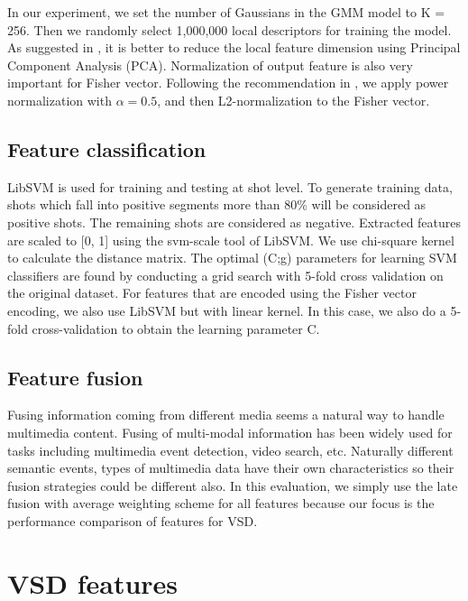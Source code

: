 \documentclass[twocolumn]{bmcart}%
\begin{document}
In our experiment, we set the number of Gaussians in the GMM model to K = 256. Then we randomly select 1,000,000 local descriptors for training the model. As suggested in \cite{perronnin2010improving}, it is better to reduce the local feature dimension using Principal Component Analysis (PCA). Normalization of output feature is also very important for Fisher vector. Following the recommendation in \cite{perronnin2010improving}, we apply power normalization with $\alpha=0.5$, and then L2-normalization to the Fisher vector.

\subsection{Feature classification}

LibSVM \cite{LibSVM} is used for training and testing at shot level. To generate training data, shots which fall into positive segments more than 80\% will be considered as positive shots. The remaining shots are considered as negative. Extracted features are scaled to [0, 1] using the svm-scale tool of LibSVM. We use chi-square kernel to calculate the distance matrix. The optimal (C;g) parameters for learning SVM classifiers are found by conducting a grid search with 5-fold cross validation on the original dataset. For features that are encoded using the Fisher vector encoding, we also use LibSVM but with linear kernel. In this case, we also do a 5-fold cross-validation to obtain the learning parameter C.

\subsection{Feature fusion}
Fusing information coming from different media seems a natural way to handle multimedia content. Fusing of multi-modal information has been widely used for tasks including multimedia event detection, video search, etc. Naturally different semantic events, types of multimedia data have their own characteristics so their fusion strategies could be different also. In this evaluation, we simply use the late fusion with average weighting scheme for all features \cite{snoek2005early} because our focus is the performance comparison of features for VSD.

\section{VSD features}
\label{vsd_feature}
\end{document}
